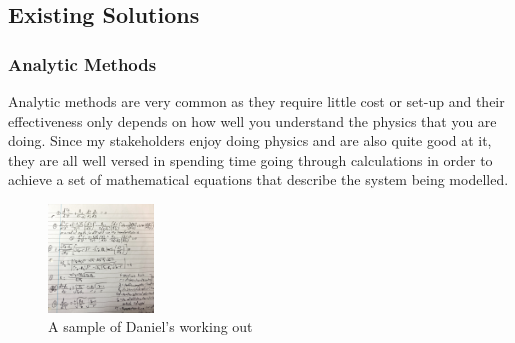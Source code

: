 \documentclass[tikz, 11pt]{article}
\begin{document}
        \subsection{Existing Solutions}
            \subsubsection{Analytic Methods}
                Analytic methods are very common as they require little cost or set-up and their effectiveness only depends on how well you understand the physics that you are doing. Since my stakeholders enjoy doing physics and are also quite good at it, they are all well versed in spending time going through calculations in order to achieve a set of mathematical equations that describe the system being modelled. 

                \begin{figure}[!ht]
                    \begin{center}
                        \includegraphics[width=0.25\textwidth]{figures/daniel_working.jpeg}
                    \end{center}
                    \caption{A sample of Daniel's working out}
                    \label{fig:daniel_working}
                \end{figure}
\end{document}
